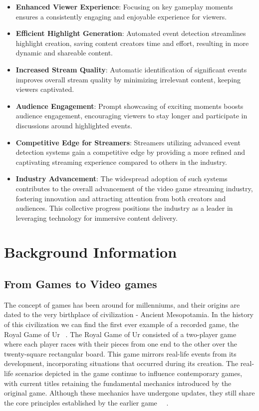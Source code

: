 \begin{itemize}
    \item \textbf{Enhanced Viewer Experience}: Focusing on key gameplay moments ensures a consistently engaging and enjoyable experience for viewers.
    \item \textbf{Efficient Highlight Generation}: Automated event detection streamlines highlight creation, saving content creators time and effort, resulting in more dynamic and shareable content.
    \item \textbf{Increased Stream Quality}: Automatic identification of significant events improves overall stream quality by minimizing irrelevant content, keeping viewers captivated.
    \item \textbf{Audience Engagement}: Prompt showcasing of exciting moments boosts audience engagement, encouraging viewers to stay longer and participate in discussions around highlighted events.
    \item \textbf{Competitive Edge for Streamers}: Streamers utilizing advanced event detection systems gain a competitive edge by providing a more refined and captivating streaming experience compared to others in the industry.
    \item \textbf{Industry Advancement}: The widespread adoption of such systems contributes to the overall advancement of the video game streaming industry, fostering innovation and attracting attention from both creators and audiences. This collective progress positions the industry as a leader in leveraging technology for immersive content delivery.
\end{itemize}

\section{Background Information}
\label{sec:BackInfo}

\subsection{From Games to Video games}    
    The concept of games has been around for millenniums, and their origins are dated to the very birthplace of civilization - Ancient Mesopotamia. In the history of this civilization we can find the first ever example of a recorded game, the Royal Game of Ur ~\cite{Videogames_IntroductionToTheIndutry}. The Royal Game of Ur consisted of a two-player game where each player races with their pieces from one end to the other over the twenty-square rectangular board. This game mirrors real-life events from its development, incorporating situations that occurred during its creation. The real-life scenarios depicted in the game continue to influence contemporary games, with current titles retaining the fundamental mechanics introduced by the original game. Although these mechanics have undergone updates, they still share the core principles established by the earlier game ~\cite{Videogames_IntroductionToTheIndutry}~\cite{RoyalGameUr_rules}.

